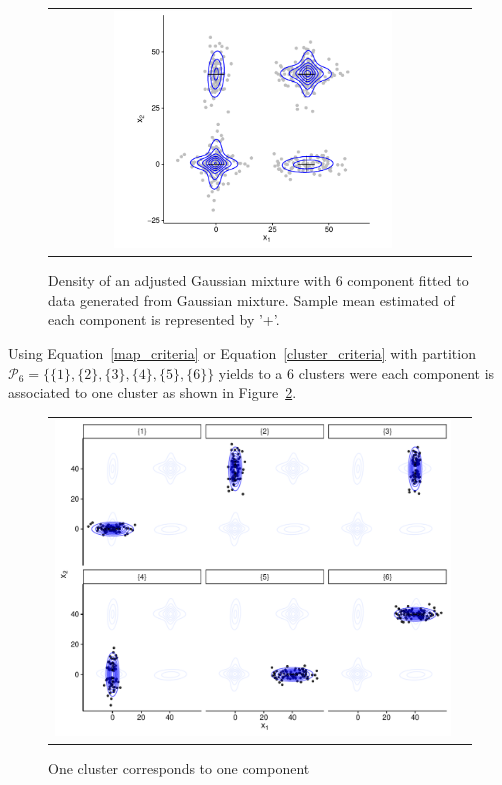 \documentclass[10pt, a4paper]{article}
\begin{document}
\begin{spacing}{1.9}
\begin{figure}[thbp]
\begin{center}
\begin{tabular}{cc}
  \includegraphics[width=0.7\textwidth]{figures/partition-example-mixture.pdf} \\
 \end{tabular}
 \caption{Density of an adjusted Gaussian mixture with 6 component fitted to data generated from Gaussian mixture. Sample mean estimated of each component is represented by '+'.}\label{ex_mixture}
\end{center}
\end{figure}

Using Equation~\ref{map_criteria} or Equation~\ref{cluster_criteria} with partition $\mathcal{P}_6 = \{ \{1\},\{2\}, \{3\}, \{4\}, \{5\}, \{6\} \}$ yields to a 6 clusters were each component is associated to one cluster as shown in Figure~\ref{ex_one_one}.

\begin{figure}[h]
\begin{center}
\begin{tabular}{cc}
  \includegraphics[width=\textwidth]{figures/partition-example-part6.pdf} \\
 \end{tabular}
 \caption{One cluster corresponds to one component}\label{ex_one_one}
\end{center}
\end{figure}


\end{spacing}
\end{document}
